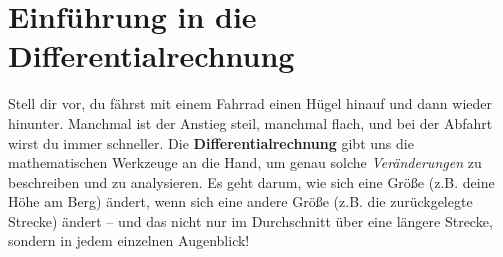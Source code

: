 \section{Einführung in die Differentialrechnung}
\label{sec:differentialrechnung}

Stell dir vor, du fährst mit einem Fahrrad einen Hügel hinauf und dann wieder hinunter. Manchmal ist der Anstieg steil, manchmal flach, und bei der Abfahrt wirst du immer schneller. Die \textbf{Differentialrechnung} gibt uns die mathematischen Werkzeuge an die Hand, um genau solche \textit{Veränderungen} zu beschreiben und zu analysieren. Es geht darum, wie sich eine Größe (z.B. deine Höhe am Berg) ändert, wenn sich eine andere Größe (z.B. die zurückgelegte Strecke) ändert – und das nicht nur im Durchschnitt über eine längere Strecke, sondern in jedem einzelnen Augenblick!

